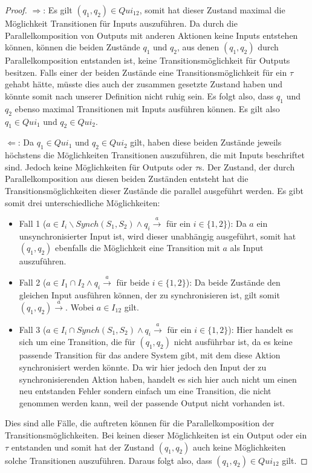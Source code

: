 \begin{proof}
  \glqq{}$\Rightarrow$\grqq{}: Es gilt $(q_1,q_2)\in Qui_{12}$, somit hat
  dieser Zustand maximal die Möglichkeit Transitionen für Inputs auszuführen.
  Da durch die Parallelkomposition von Outputs mit anderen Aktionen keine
  Inputs entstehen können, können die beiden Zustände $q_1$ und $q_2$, aus
  denen $(q_1,q_2)$ durch Parallelkomposition entstanden ist, keine
  Transitionsmöglichkeit für Outputs besitzen. Falls einer der beiden Zustände
  eine Transitionsmöglichkeit für ein $\tau$ gehabt hätte, müsste dies auch der
  zusammen gesetzte Zustand haben und könnte somit nach unserer Definition
  nicht ruhig sein. Es folgt also, dass $q_1$ und $q_2$ ebenso maximal
  Transitionen mit Inputs ausführen können. Es gilt also $q_1\in Qui_1$ und
  $q_2\in Qui_2$. %

  \glqq{}$\Leftarrow$\grqq{}: Da $q_1\in Qui_1$ und $q_2\in Qui_2$ gilt, haben
  diese beiden Zustände jeweils höchstens die Möglichkeiten Transitionen
  auszuführen, die mit Inputs beschriftet sind. Jedoch keine Möglichkeiten für
  Outputs oder $\tau$s. Der Zustand, der durch Parallelkomposition aus diesen
  beiden Zuständen entsteht hat die Transitionsmöglichkeiten dieser Zustände
  die parallel ausgeführt werden. Es gibt somit drei unterschiedliche
  Möglichkeiten:
  \begin{itemize}
    \item Fall 1 ($a\in I_i\backslash Synch(S_1,S_2)\wedge q_i
      \overset{a}{\rightarrow}$ für ein $i\in \{1,2\}$): Da $a$ ein
      unsynchronisierter Input ist, wird dieser unabhängig ausgeführt, somit hat
      $(q_1,q_2)$ ebenfalls die Möglichkeit eine Transition mit $a$ als Input
      auszuführen.
    \item Fall 2 ($a\in I_1\cap I_2\wedge q_i \overset{a}{\rightarrow}$ für
      beide $i\in \{1,2\}$): Da beide Zustände den gleichen Input ausführen
      können, der zu synchronisieren ist, gilt somit $(q_1,q_2)
      \overset{a}{\rightarrow}$. Wobei $a\in I_{12}$ gilt.
    \item Fall 3 ($a\in I_i\cap Synch(S_1,S_2)\wedge q_i
      \overset{a}{\rightarrow}$ für ein $i\in \{1,2\}$): Hier handelt es sich
      um eine Transition, die für $(q_1,q_2)$ nicht ausführbar ist, da es keine
      passende Transition für das andere System gibt, mit dem diese Aktion
      synchronisiert werden könnte. Da wir hier jedoch den Input der zu
      synchronisierenden Aktion haben, handelt es sich hier auch nicht um einen
      neu entstanden Fehler sondern einfach um eine Transition, die nicht
      genommen werden kann, weil der passende Output nicht vorhanden ist.
  \end{itemize}
  Dies sind alle Fälle, die auftreten können für die Parallelkomposition der
  Transitionsmöglichkeiten. Bei keinen dieser Möglichkeiten ist ein Output oder
  ein $\tau$ entstanden und somit hat der Zustand $(q_1,q_2)$ auch keine
  Möglichkeiten solche Transitionen auszuführen. Daraus folgt also, dass
  $(q_1,q_2)\in Qui_{12}$ gilt.
\end{proof}

